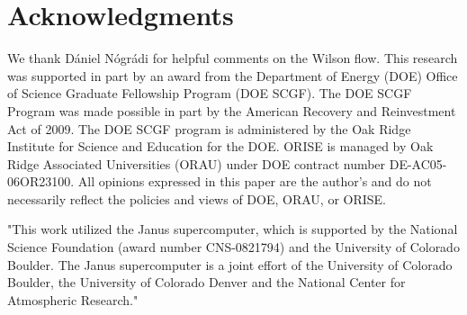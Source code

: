 \documentclass{PoS}
\begin{document}
\section*{Acknowledgments}
We thank D\'aniel N\'ogr\'adi for helpful comments on the Wilson flow.
This research was supported in part by an award from the Department of Energy (DOE) Office of Science Graduate Fellowship Program (DOE SCGF).
The DOE SCGF Program was made possible in part by the American Recovery and Reinvestment Act of 2009.
The DOE SCGF program is administered by the Oak Ridge Institute for Science and Education for the DOE.
ORISE is managed by Oak Ridge Associated Universities (ORAU) under DOE contract number DE-AC05-06OR23100.
All opinions expressed in this paper are the author's and do not necessarily reflect the policies and views of DOE, ORAU, or ORISE.

"This work utilized the Janus supercomputer, which is supported by the National Science Foundation (award number CNS-0821794) and the University of Colorado Boulder.
The Janus supercomputer is a joint effort of the University of Colorado Boulder, the University of Colorado Denver and the National Center for Atmospheric Research."



\end{document}
